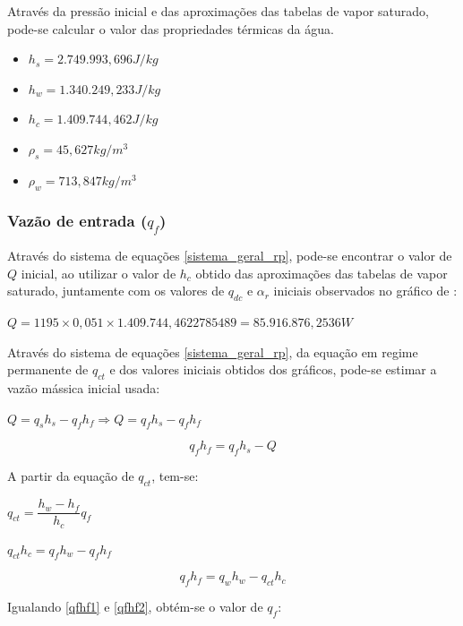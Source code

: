 Através da pressão inicial e das aproximações das tabelas de vapor
saturado, pode-se calcular o valor das propriedades térmicas da água.

\begin{itemize}
\item $h_s = 2.749.993,696 J/kg$
\item $h_w = 1.340.249,233 J/kg $
\item $h_c = 1.409.744,462 J/kg$
\item $\rho_s = 45,627 kg/m^3$
\item $\rho_w = 713,847 kg/m^3$
\end{itemize}

\subsubsection{Vazão de entrada ($ q_f $)}

Através do sistema de equações \ref{sistema_geral_rp}, pode-se
encontrar o valor de $Q$ inicial, ao utilizar o valor de $h_c$ obtido
das aproximações das tabelas de vapor saturado, juntamente com os
valores de $q_{dc}$ e $\alpha_r$ iniciais observados no gráfico de
:

$Q = 1195 \times 0,051 \times 1.409.744,4622785489 = 85.916.876,2536
W$

Através do sistema de equações \ref{sistema_geral_rp}, da equação em
regime permanente de $q_{ct}$ e dos valores iniciais obtidos dos
gráficos, pode-se estimar a vazão mássica inicial usada:


\begin{center}
  $Q = q_s h_s - q_f h_f \Rightarrow Q = q_f h_s - q_f h_f$
\end{center}

\begin{equation}  
  q_f h_f = q_f h_s - Q
  \label{qfhf1}
\end{equation}

A partir da equação de $q_{ct}$, tem-se:

\begin{center}
  $q_{ct} = \dfrac{h_w - h_f}{h_c} q_f$

  $q_{ct} h_c = q_f h_w - q_f h_f$
\end{center}

\begin{equation}
  q_f h_f = q_w h_w - q_{ct} h_c
  \label{qfhf2}
\end{equation}

Igualando \ref{qfhf1} e \ref{qfhf2}, obtém-se o valor de $q_f$:

